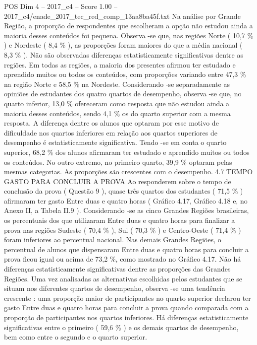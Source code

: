 \begin{textsample}{POS Dim 4 – 2017\_c4 – Score 1.00 – 2017\_c4/enade\_2017\_tec\_red\_comp\_13aa8ba45f.txt}
Na análise por Grande Região, a proporção de respondentes que escolheram a opção não estudou ainda a maioria desses conteúdos foi pequena.
Observa -se que, nas regiões Norte ( 10,7 \% ) e Nordeste ( 8,4 \% ), as proporções foram maiores do que a média nacional ( 8,3 \% ).
Não são observadas diferenças estatisticamente significativas dentre as regiões.
Em todas as regiões, a maioria dos presentes afirmou ter estudado e aprendido muitos ou todos os conteúdos, com proporções variando entre 47,3 \% na região Norte e 58,5 \% na Nordeste.
Considerando -se separadamente as opiniões de estudantes dos quatro quartos de desempenho, observa -se que, no quarto inferior, 13,0 \% ofereceram como resposta que não estudou ainda a maioria desses conteúdos, sendo 4,1 \% os do quarto superior com a mesma resposta.
A diferença dentre os alunos que optaram por esse motivo de dificuldade nos quartos inferiores em relação aos quartos superiores de desempenho é estatisticamente significativa.
Tendo -se em conta o quarto superior, 68,2 \% dos alunos afirmaram ter estudado e aprendido muitos ou todos os conteúdos.
No outro extremo, no primeiro quarto, 39,9 \% optaram pelas mesmas categorias.
As proporções são crescentes com o desempenho. 4.7 TEMPO GASTO PARA CONCLUIR A PROVA Ao responderem sobre o tempo de conclusão da prova ( Questão 9 ), quase três quartos dos estudantes ( 71,5 \% ) afirmaram ter gasto Entre duas e quatro horas ( Gráfico 4.17, Gráfico 4.18 e, no Anexo II, a Tabela II.9 ).
Considerando -se as cinco Grandes Regiões brasileiras, os percentuais dos que utilizaram Entre duas e quatro horas para finalizar a prova nas regiões Sudeste ( 70,4 \% ), Sul ( 70,3 \% ) e Centro-Oeste ( 71,4 \% ) foram inferiores ao percentual nacional.
Nas demais Grandes Regiões, o percentual de alunos que dispensaram Entre duas e quatro horas para concluir a prova ficou igual ou acima de 73,2 \%, como mostrado no Gráfico 4.17.
Não há diferenças estatisticamente significativas dentre as proporções das Grandes Regiões.
Uma vez analisadas as alternativas escolhidas pelos estudantes que se situam nos diferentes quartos de desempenho, observa -se uma tendência crescente : uma proporção maior de participantes no quarto superior declarou ter gasto Entre duas e quatro horas para concluir a prova quando comparada com a proporção de participantes nos quartos inferiores.
Há diferenças estatisticamente significativas entre o primeiro ( 59,6 \% ) e os demais quartos de desempenho, bem como entre o segundo e o quarto superior.

\end{textsample}

